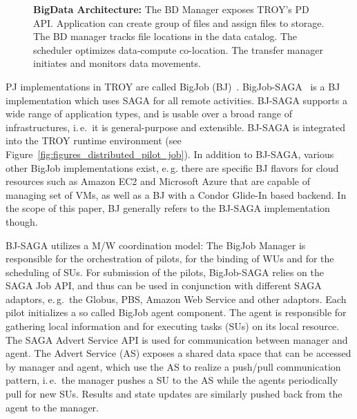 \documentclass[conference,final]{IEEEtran}
\newcommand{\up}{\vspace*{-1em}}
\begin{document}
\begin{figure}[t]
\begin{minipage}[t]{0.475\linewidth}
    \caption{\textbf{BigData Architecture:} The BD Manager exposes
      TROY's PD API. Application can create group of files and assign 
      files to storage. The BD manager tracks file locations in
      the data catalog. The scheduler optimizes data-compute co-location.
      The transfer manager initiates and monitors data movements. \up\up}
	\label{fig:pilot-data-architecture}
	\end{minipage}
\end{figure}



PJ implementations in TROY are called BigJob (BJ)~\cite{bigjob_web}.
BigJob-SAGA~\cite{saga_bigjob_condor_cloud} is a BJ implementation
which uses SAGA for all remote activities.  BJ-SAGA supports a wide
range of application types, and is usable over a broad range of
infrastructures, i.\,e.\ it is general-purpose and extensible. BJ-SAGA
is integrated into the TROY runtime environment 
(see Figure~\ref{fig:figures_distributed_pilot_job}).  In addition to
BJ-SAGA, various other BigJob implementations exist, e.\,g. there are
specific BJ flavors for cloud resources such as Amazon EC2 and
Microsoft Azure that are capable of managing set of VMs, as well as a
BJ with a Condor Glide-In based backend.  In the scope of this paper,
BJ generally refers to the BJ-SAGA implementation though.

BJ-SAGA utilizes a M/W coordination model: The BigJob Manager is responsible for
the orchestration of pilots, for the binding of WUs and for the scheduling of
SUs. For submission of the pilots, BigJob-SAGA relies on the SAGA Job API, and
thus can be used in conjunction with different SAGA adaptors, e.\,g.\ the
Globus, PBS, Amazon Web Service and other adaptors. Each pilot initializes a so
called BigJob agent component. The agent is responsible for gathering local
information and for executing tasks (SUs) on its local resource. The SAGA Advert
Service API is used for communication between manager and agent. The Advert
Service (AS) exposes a shared data space that can be accessed by manager and
agent, which use the AS to realize a push/pull communication pattern,
i.\,e.\ the manager pushes a SU to the AS while the agents periodically pull for
new SUs. Results and state updates are similarly pushed back from the agent to the manager.
\end{document}
